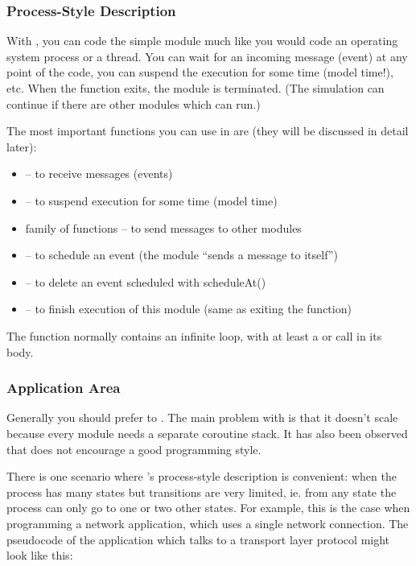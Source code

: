 \subsubsection{Process-Style Description}

With , you can code the simple
module much like you would code an operating system process or a
thread. You can wait for an incoming message (event) at any point of
the code, you can suspend the execution for some time (model time!),
etc. When the  function exits, the module is
terminated.  (The simulation can continue if there are other modules
which can run.)


The most important functions you can use in  are
(they will be discussed in detail later):
\begin{itemize}
\item{ -- to receive messages (events)}
\item{ -- to suspend execution
    for some time (model time)}
\item{ family of functions -- to send messages to other
    modules}
\item{ -- to schedule an event (the module ``sends
    a message to itself'')}
\item{ -- to delete an event scheduled with
    scheduleAt()}
\item{ -- to finish execution of this module (same as
    exiting the  function)}
\end{itemize}

The  function normally contains an infinite loop,
with at least a  or  call in its body.



\subsubsection{Application Area}

Generally you should prefer  to .
The main problem with  is that it doesn't scale because
every module needs a separate coroutine stack. It has also been observed
that  does not encourage a good programming style.

There is one scenario where 's process-style
description is convenient: when the process has many
states but transitions are very limited, ie. from any state the
process can only go to one or two other states.  For example, this is
the case when programming a network application, which uses a single
network connection.  The pseudocode of the application which talks to
a transport layer protocol might look like this:


